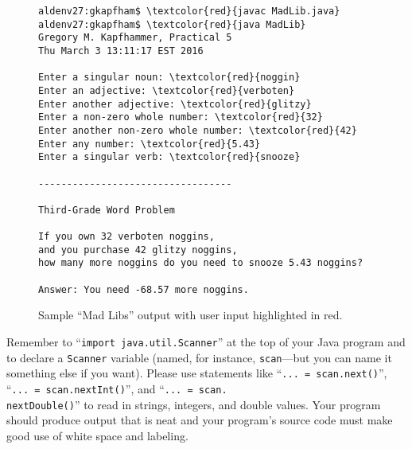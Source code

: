 \begin{figure}[tb]
\begin{Verbatim}[commandchars=\\\{\}]
aldenv27:gkapfham$ \textcolor{red}{javac MadLib.java}
aldenv27:gkapfham$ \textcolor{red}{java MadLib}
Gregory M. Kapfhammer, Practical 5
Thu March 3 13:11:17 EST 2016

Enter a singular noun: \textcolor{red}{noggin}
Enter an adjective: \textcolor{red}{verboten}
Enter another adjective: \textcolor{red}{glitzy}
Enter a non-zero whole number: \textcolor{red}{32}
Enter another non-zero whole number: \textcolor{red}{42}
Enter any number: \textcolor{red}{5.43}
Enter a singular verb: \textcolor{red}{snooze}

----------------------------------

Third-Grade Word Problem

If you own 32 verboten noggins,
and you purchase 42 glitzy noggins,
how many more noggins do you need to snooze 5.43 noggins?

Answer: You need -68.57 more noggins.
\end{Verbatim}
\vspace*{-.1in}
\caption{Sample ``Mad Libs'' output with user input highlighted in red.}
\label{mad}
\end{figure}

\noindent Remember to ``{\tt import java.util.Scanner}'' at the top of your Java program and to declare a {\tt Scanner}
variable (named, for instance, {\tt scan}---but you can name it something else if you want). Please use statements like
``{\tt... = scan.next()}'', ``{\tt... = scan.nextInt()}'', and ``{\tt... = scan.\\nextDouble()}'' to read in strings,
integers, and double values. Your program should produce output that is neat and your program's source code must make
good use of white space and labeling.

\vspace*{-.15in}
